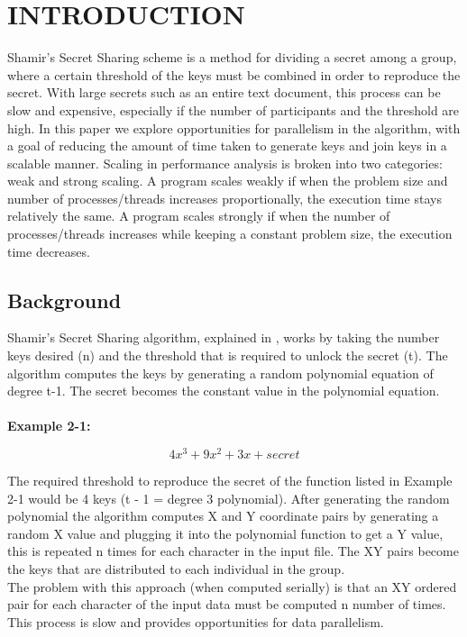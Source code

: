 \documentclass[main.tex]{subfiles}
\begin{document}
\section{INTRODUCTION} \label{sec2}

\indent Shamir's Secret Sharing scheme is a method for dividing a secret among a group, where a certain threshold of the keys must be combined in order to reproduce the secret.  With large secrets such as an entire text document, this process can be slow and expensive, especially if the number of participants and the threshold are high. In this paper we explore opportunities for parallelism in the algorithm, with a goal of reducing the amount of time taken to generate keys and join keys in a scalable manner. Scaling in performance analysis is broken into two categories: weak and strong scaling. A program scales weakly if when the problem size and number of processes/threads increases proportionally, the execution time stays relatively the same. A program scales strongly if when the number of processes/threads increases while keeping a constant problem size, the execution time decreases.

\subsection{Background}

\indent Shamir's Secret Sharing algorithm, explained in \cite{three}, works by taking the number keys desired (n) and the threshold that is required to unlock the secret (t).  The algorithm computes the keys by generating a random polynomial equation of degree t-1.  The secret becomes the constant value in the polynomial equation.\\ \\

\textbf{Example 2-1:}

\[ 4x^3 +  9x^2 + 3x + secret\]

\indent The required threshold to reproduce the secret of the function listed in Example 2-1 would be 4 keys (t - 1 = degree 3 polynomial). After generating the random polynomial the algorithm computes X and Y coordinate pairs by generating a random X value and plugging it into the polynomial function to get a Y value, this is repeated n times for each character in the input file.  The XY pairs become the keys that are distributed to each individual in the group. \\
\indent The problem with this approach (when computed serially) is that an XY ordered pair for each character of the input data must be computed n number of times. This process is slow and provides opportunities for data parallelism.
\end{document}
